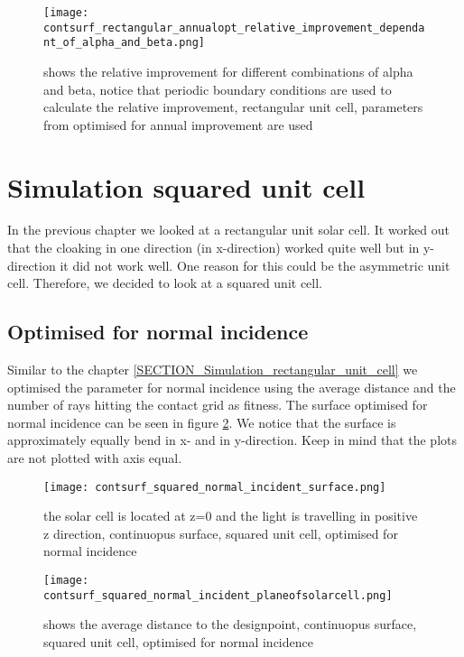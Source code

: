 \begin{figure}[h]
\centering
\texttt{[image: contsurf\_rectangular\_annualopt\_relative\_improvement\_dependant\_of\_alpha\_and\_beta.png]}
\caption{shows the relative improvement for different combinations of alpha and beta, notice that periodic boundary conditions are used to calculate the relative improvement, rectangular unit cell, parameters from optimised for annual improvement are used \label{contsurf_rectangular_annualopt_relative_improvement_dependant_of_alpha_and_beta}}
\end{figure}

\clearpage

\section{Simulation squared unit cell}

In the previous chapter we looked at a rectangular unit solar cell. It worked out that the cloaking in one direction (in x-direction) worked quite well but in y-direction it did not work well. One reason for this could be the asymmetric unit cell. Therefore, we decided to look at a squared unit cell. 

\subsection{Optimised for normal incidence}

Similar to the chapter \ref{SECTION_Simulation_rectangular_unit_cell} we optimised the parameter for normal incidence using the average distance and the number of rays hitting the contact grid as fitness. The surface optimised for normal incidence can be seen in figure \ref{contsurf_squared_normal_incident_surface}. We notice that the surface is approximately equally bend in x- and in y-direction. Keep in mind that the plots are not plotted with axis equal. 

\begin{figure}[h]
\centering
\texttt{[image: contsurf\_squared\_normal\_incident\_surface.png]}
\caption{the solar cell is located at z=0 and the light is travelling in positive z direction, continuopus surface, squared unit cell, optimised for normal incidence \label{contsurf_squared_normal_incident_surface}}
\end{figure}

\begin{figure}[h]
\centering
\texttt{[image: contsurf\_squared\_normal\_incident\_planeofsolarcell.png]}
\caption{shows the average distance to the designpoint, continuopus surface, squared unit cell, optimised for normal incidence \label{contsurf_squared_normal_incident_planeofsolarcell}}
\end{figure}


